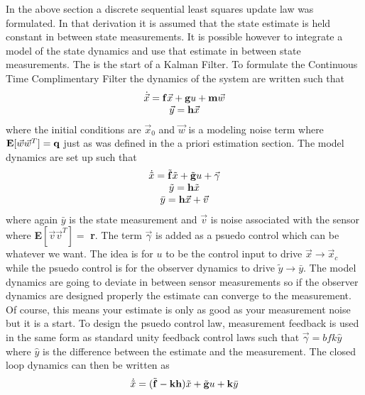In the above section a discrete sequential least squares update law
was formulated. In that derivation it is assumed that the state
estimate is held constant in between state measurements. It is
possible however to integrate a model of the state dynamics and use
that estimate in between state measurements. The is the start of a
Kalman Filter. To formulate the Continuous Time Complimentary Filter
the dynamics of the system are written such that
\begin{equation}
  \begin{matrix}
    \dot{\vec{x}} = {\bf f}\vec{x} + {\bf g}u +{\bf m}\vec{w} \\
    \vec{y} = {\bf h}\vec{x}
  \end{matrix}
\end{equation}
where the initial conditions are $\vec{x}_0$ and $\vec{w}$ is a
modeling noise term where ${\bf E}[\vec{w}\vec{w}^T]={\bf q}$ just as
was defined in the a priori estimation section. The model dynamics are
set up such that 
\begin{equation}
  \begin{matrix}
    \dot{\tilde{x}} = \tilde{{\bf f}}\tilde{x} + \tilde{{\bf g}}u + \vec{\gamma}\\
    \tilde{y} = {\bf h}\tilde{x} \\
    \bar{y} = {\bf h}\vec{x} + \vec{v}
  \end{matrix}
\end{equation}
where again $\bar{y}$ is the state measurement and $\vec{v}$ is noise
associated with the sensor where {\bf E}$[\vec{v}\vec{v}^T]=${\bf
  r}. The term $\vec{\gamma}$ is added as a psuedo control which can
be whatever we want. The idea is for $u$ to be the control input to
drive $\vec{x} \rightarrow \vec{x}_c$ while the psuedo control is for
the observer dynamics to drive $\tilde{y} \rightarrow \bar{y}$. The
model dynamics are going to deviate in between sensor measurements so
if the observer dynamics are designed properly the estimate can
converge to the measurement. Of course, this means your estimate is
only as good as your measurement noise but it is a start. To design
the psuedo control law, measurement feedback is used in the same form
as standard unity feedback control laws such that $\vec{\gamma} =
{bf k}\hat{y}$ where $\hat{y}$ is the difference between the estimate and
the measurement. The closed loop dynamics can then be written as
\begin{equation}
  \dot{\tilde{x}} = (\tilde{{\bf f}}-{\bf k}{\bf h})\tilde{x} + \tilde{{\bf g}}u
  + {\bf k}\bar{y}
\end{equation}
